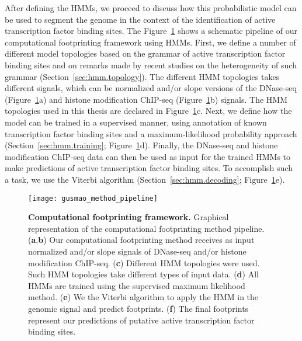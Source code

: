 After defining the HMMs, we proceed to discuss how this probabilistic model can be used to segment the genome in the context of the identification of active transcription factor binding sites. The Figure~\ref{fig:gusmao_method_pipeline} shows a schematic pipeline of our computational footprinting framework using HMMs. First, we define a number of different model topologies based on the grammar of active transcription factor binding sites and on remarks made by recent studies on the heterogeneity of such grammar (Section~\ref{sec:hmm.topology}). The different HMM topologies takes different signals, which can be normalized and/or slope versions of the DNase-seq (Figure~\ref{fig:gusmao_method_pipeline}a) and histone modification ChIP-seq (Figure~\ref{fig:gusmao_method_pipeline}b) signals. The HMM topologies used in this thesis are declared in Figure~\ref{fig:gusmao_method_pipeline}c. Next, we define how the model can be trained in a supervised manner, using annotation of known transcription factor binding sites and a maximum-likelihood probability approach (Section~\ref{sec:hmm.training}; Figure~\ref{fig:gusmao_method_pipeline}d). Finally, the DNase-seq and histone modification ChIP-seq data can then be used as input for the trained HMMs to make predictions of active transcription factor binding sites. To accomplish such a task, we use the Viterbi algorithm (Section~\ref{sec:hmm.decoding}; Figure~\ref{fig:gusmao_method_pipeline}e).

\begin{figure}[h!]
\centering
\texttt{[image: gusmao\_method\_pipeline]}
\caption[Computational footprinting framework]{\textbf{Computational footprinting framework.} Graphical representation of the computational footprinting method pipeline. (\textbf{a},\textbf{b}) Our computational footprinting method receives as input normalized and/or slope signals of DNase-seq and/or histone modification ChIP-seq. (\textbf{c}) Different HMM topologies were used. Such HMM topologies take different types of input data. (\textbf{d}) All HMMs are trained using the supervised maximum likelihood method. (\textbf{e}) We the Viterbi algorithm to apply the HMM in the genomic signal and predict footprints. (\textbf{f}) The final footprints represent our predictions of putative active transcription factor binding sites.}
\label{fig:gusmao_method_pipeline}
\end{figure}

